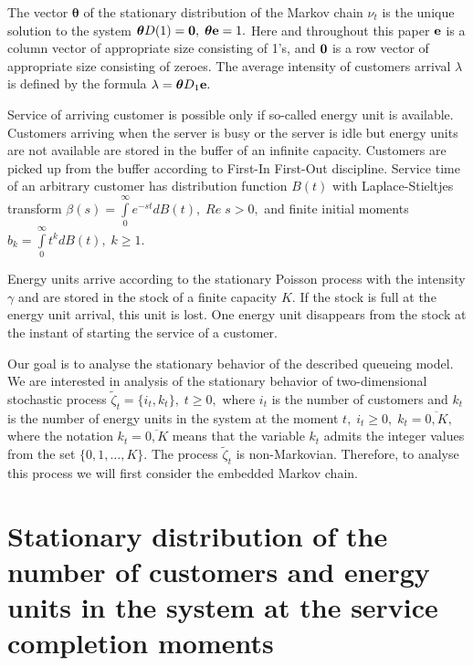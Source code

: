 \documentclass[12pt, a4paper]{article}
\begin{document}
The vector ${\boldsymbol \theta}$ of the stationary distribution of the Markov chain $\nu_t$ is the unique solution to the system $\boldsymbol{\theta} D(1)={\bf 0},\; \boldsymbol{\theta}{\bf e}=1.$ Here and throughout this
paper  ${\bf e}$ is a column vector of appropriate size consisting
of 1's, and ${\bf 0}$ is a row vector of appropriate size consisting
of zeroes. The average intensity of  customers arrival
$\lambda$ is defined by the formula $\lambda=\boldsymbol{\theta} D_1 {\bf e}.$

Service of arriving customer is possible only if so-called energy unit is available. Customers arriving when the server is busy or the server is idle but energy units are not available are stored in the buffer of an infinite capacity. Customers are picked up from the buffer according to First-In First-Out discipline. Service time of an arbitrary customer has distribution function $B(t)$ with Laplace-Stieltjes transform $\beta(s)=\int\limits_{0}^{\infty} e^{-st} dB(t),\; Re \; s >0,$ and finite initial moments $b_k=\int\limits_{0}^{\infty} t^k dB(t),\; k \ge 1.$

Energy units arrive according to the stationary Poisson process with the intensity $\gamma$ and are stored in the stock of a finite capacity $K.$ If the stock is full at the energy unit arrival, this unit is lost. One energy unit disappears from the stock at the instant of starting the service of a customer.

Our goal is to analyse the stationary behavior of the described queueing model. We are interested in analysis of the stationary behavior of two-dimensional stochastic process $\tilde  \zeta_t=\{i_{t}, k_{t}\},\; t \ge 0,$
where $i_t$ is the number of customers  and $k_t$ is the number of energy units in the system at the moment $t,\; i_t \ge 0,\; k_t=\overline{0,K},$ where the notation $k_t=\overline{0,K}$ means that the variable $k_t$ admits the integer values from the set $\{0,1,\dots,K\}.$ The process $\tilde  \zeta_t$ is non-Markovian. Therefore, to analyse this process we will first consider the embedded Markov chain.


\section{Stationary distribution of the number of customers and energy units in the system at the service completion moments}
\end{document}
